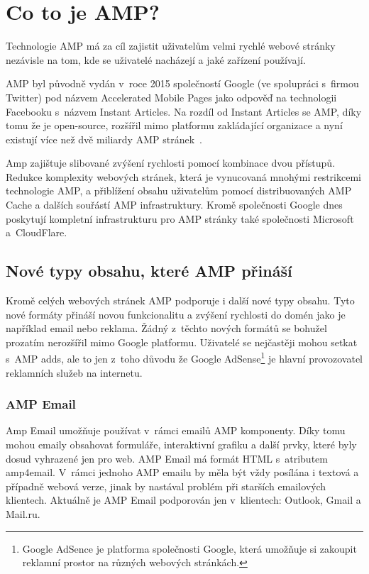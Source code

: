 \chapter{Co to je AMP?}
\label{AMP}
Technologie AMP má za cíl zajistit uživatelům velmi rychlé webové stránky nezávisle na tom, kde se
uživatelé nacházejí a jaké zařízení používají.

AMP byl původně vydán v~roce 2015 společností Google (ve spolupráci s~firmou Twitter) pod názvem Accelerated Mobile Pages jako odpověď
na technologii Facebooku s~názvem Instant Articles. Na rozdíl od Instant Articles se AMP, díky tomu že je
open-source, rozšířil mimo platformu zakládající organizace a nyní existují více než dvě miliardy AMP
stránek~\cite{AMPTurbo}.

Amp zajištuje slibované zvýšení rychlosti pomocí kombinace dvou přístupů. Redukce komplexity webových stránek, která je vynucovaná mnohými restrikcemi technologie AMP, a přiblížení obsahu uživatelům pomocí distribuovaných AMP Cache a dalších souřástí AMP infrastruktury. Kromě společnosti Google dnes poskytují kompletní infrastrukturu pro AMP stránky také
společnosti Microsoft a~CloudFlare.

\section{Nové typy obsahu, které AMP přináší}
Kromě celých webových stránek AMP podporuje i další nové typy obsahu. Tyto nové formáty přináší novou funkcionalitu a zvýšení rychlosti do domén jako je například email nebo reklama. Žádný z~těchto nových formátů se bohužel prozatím nerozšířil mimo Google platformu. Uživatelé se nejčastěji mohou setkat s~AMP adds, ale to jen z~toho důvodu že Google AdSense\footnote{Google AdSence je platforma společnosti Google, která umožňuje si zakoupit reklamní prostor na různých webových stránkách.} je hlavní provozovatel reklamních služeb na internetu.
\subsection*{AMP Email}
Amp Email umožňuje používat v~rámci emailů AMP komponenty. Díky tomu mohou emaily obsahovat formuláře, interaktivní grafiku a další prvky, které byly dosud vyhrazené jen pro web. AMP Email má formát HTML s~atributem amp4email. V~rámci jednoho AMP emailu by měla být vždy posílána i textová a případně webová verze, jinak by nastával problém při starších emailových klientech\cite[Ch.\ 6, p.\ 285]{VzhuruDoAMP}.
Aktuálně je AMP Email podporován jen v~klientech:
Outlook, Gmail a Mail.ru\cite{EmailSupport}.
